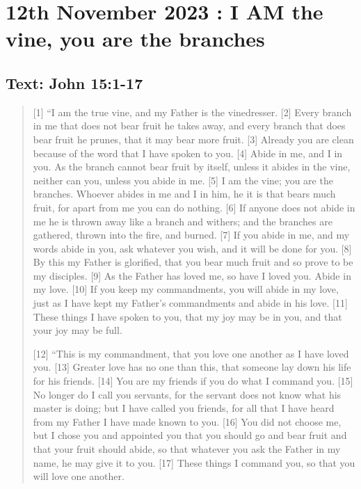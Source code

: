 \setcounter{figure}{0}

\section{12th November 2023 : I AM the vine, you are the branches}
\subsection*{Text: John 15:1-17}
  \begin{quote}
    [1] “I am the true vine, and my Father is the vinedresser. [2] Every
    branch in me that does not bear fruit he takes away, and every branch
    that does bear fruit he prunes, that it may bear more fruit. [3] Already
    you are clean because of the word that I have spoken to you. [4] Abide in
    me, and I in you. As the branch cannot bear fruit by itself, unless it
    abides in the vine, neither can you, unless you abide in me. [5] I am the
    vine; you are the branches. Whoever abides in me and I in him, he it is
    that bears much fruit, for apart from me you can do nothing. [6] If
    anyone does not abide in me he is thrown away like a branch and withers;
    and the branches are gathered, thrown into the fire, and burned. [7] If
    you abide in me, and my words abide in you, ask whatever you wish, and it
    will be done for you. [8] By this my Father is glorified, that you bear
    much fruit and so prove to be my disciples. [9] As the Father has loved
    me, so have I loved you. Abide in my love. [10] If you keep my
    commandments, you will abide in my love, just as I have kept my Father’s
    commandments and abide in his love. [11] These things I have spoken to
    you, that my joy may be in you, and that your joy may be full.

    [12] “This is my commandment, that you love one another as I have loved
    you. [13] Greater love has no one than this, that someone lay down his
    life for his friends. [14] You are my friends if you do what I command
    you. [15] No longer do I call you servants, for the servant does not know
    what his master is doing; but I have called you friends, for all that I
    have heard from my Father I have made known to you. [16] You did not
    choose me, but I chose you and appointed you that you should go and bear
    fruit and that your fruit should abide, so that whatever you ask the
    Father in my name, he may give it to you. [17] These things I command
    you, so that you will love one another.
  \end{quote}
